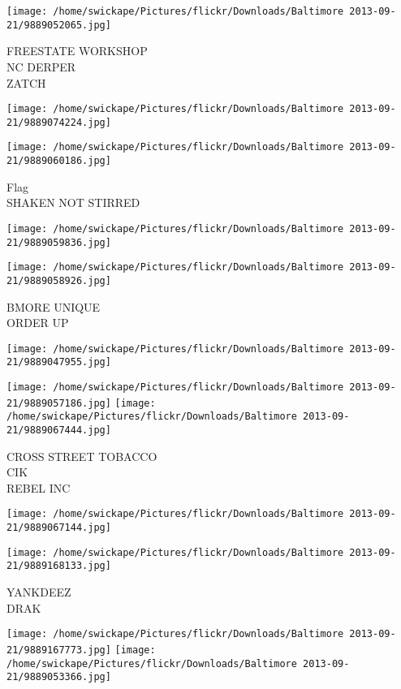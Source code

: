 \documentclass[10pt,letterpaper]{article}
\begin{document}
\texttt{[image: /home/swickape/Pictures/flickr/Downloads/Baltimore 2013-09-21/9889052065.jpg]}

FREESTATE WORKSHOP\\
NC DERPER\\
ZATCH
\pagebreak

\texttt{[image: /home/swickape/Pictures/flickr/Downloads/Baltimore 2013-09-21/9889074224.jpg]}

\vspace{0.25in}
\texttt{[image: /home/swickape/Pictures/flickr/Downloads/Baltimore 2013-09-21/9889060186.jpg]}

Flag\\
SHAKEN NOT STIRRED
\pagebreak

\texttt{[image: /home/swickape/Pictures/flickr/Downloads/Baltimore 2013-09-21/9889059836.jpg]}

\vspace{0.25in}
\texttt{[image: /home/swickape/Pictures/flickr/Downloads/Baltimore 2013-09-21/9889058926.jpg]}

BMORE UNIQUE\\
ORDER UP
\pagebreak

\texttt{[image: /home/swickape/Pictures/flickr/Downloads/Baltimore 2013-09-21/9889047955.jpg]}

\vspace{0.25in}
\texttt{[image: /home/swickape/Pictures/flickr/Downloads/Baltimore 2013-09-21/9889057186.jpg]}
\texttt{[image: /home/swickape/Pictures/flickr/Downloads/Baltimore 2013-09-21/9889067444.jpg]}

CROSS STREET TOBACCO\\
CIK\\
REBEL INC
\pagebreak

\texttt{[image: /home/swickape/Pictures/flickr/Downloads/Baltimore 2013-09-21/9889067144.jpg]}

\vspace{0.25in}
\texttt{[image: /home/swickape/Pictures/flickr/Downloads/Baltimore 2013-09-21/9889168133.jpg]}

YANKDEEZ\\
DRAK
\pagebreak

\texttt{[image: /home/swickape/Pictures/flickr/Downloads/Baltimore 2013-09-21/9889167773.jpg]}
\texttt{[image: /home/swickape/Pictures/flickr/Downloads/Baltimore 2013-09-21/9889053366.jpg]}
\end{document}
